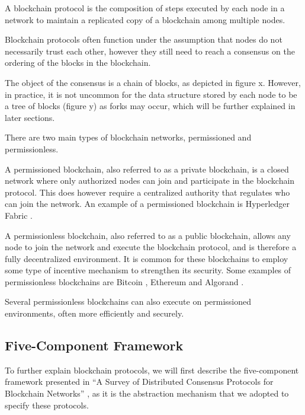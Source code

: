 A blockchain protocol is the composition of steps executed by each node in a network to maintain a replicated copy of a blockchain among multiple nodes. 

Blockchain protocols often function under the assumption that nodes do not necessarily trust each other, however they still need to reach a consensus on the ordering of the blocks in the blockchain.

The object of the consensus is a chain of blocks, as depicted in figure x. However, in practice, it is not uncommon for the data structure stored by each node to be a tree of blocks (figure y) as forks may occur, which will be further explained in later sections.


\vspace{0.5cm}

There are two main types of blockchain networks, permissioned and permissionless.

A permissioned blockchain, also referred to as a private blockchain, is a closed network where only authorized nodes can join and participate in the blockchain protocol. This does however require a centralized authority that regulates who can join the network. An example of a permissioned blockchain is Hyperledger Fabric \cite{hyperledger_fabric}.

A permissionless blockchain, also referred to as a public blockchain, allows any node to join the network and execute the blockchain protocol, and is therefore a fully decentralized environment. It is common for these blockchains to employ some type of incentive mechanism to strengthen its security. Some examples of permissionless blockchains are Bitcoin \cite{bitcoin}, Ethereum \cite{ethereum_whitepaper} and Algorand \cite{algorand_scale_byz_agreements}.

Several permissionless blockchains can also execute on permissioned environments, often more efficiently and securely.

\subsection{Five-Component Framework}

To further explain blockchain protocols, we will first describe the five-component framework presented in “A Survey of Distributed Consensus Protocols for Blockchain Networks” \cite{survey_bchain_networks}, as it is the abstraction mechanism that we adopted to specify these protocols.

